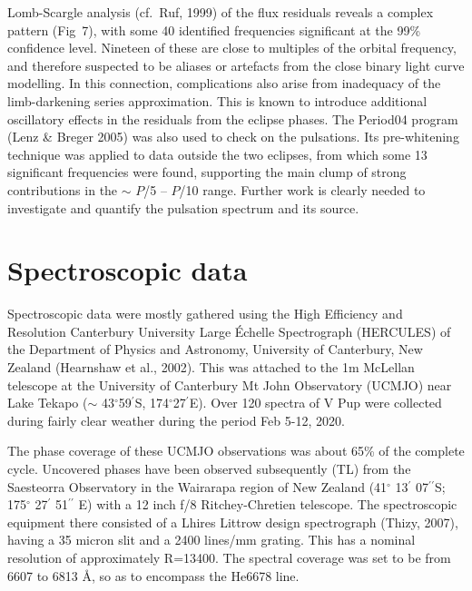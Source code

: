 \documentclass[useAMS,usenatbib]{mnras}                                                                           \usepackage[pdftex]{graphicx}
\def\degr{\hbox{$^\circ$}}
\def\arcmin{\hbox{$^\prime$}}
\begin{document}
  Lomb-Scargle analysis (cf.\ Ruf, 1999) 
of the flux residuals reveals a complex pattern
(Fig~7), with some 40 identified frequencies significant at the 99\% confidence level.
Nineteen of these are close to multiples of the orbital frequency, 
and therefore suspected to be aliases or artefacts from the close binary 
light curve modelling.  In this connection, complications also
arise from inadequacy of the limb-darkening series approximation.  This is known to
introduce additional oscillatory effects in the residuals from the
eclipse phases.  
The {\sc Period04} program (Lenz \& Breger 2005) was also used to check on 
the pulsations. Its pre-whitening technique was applied 
to data outside the two eclipses, from which some 13 significant
frequencies were found, supporting the main clump of strong
contributions in the $\sim$ $P$/5 -- $P$/10 range.
Further work is
clearly needed to investigate and quantify the pulsation spectrum and its source. 
 
\section{Spectroscopic data}
 
Spectroscopic data were mostly gathered using the
High Efficiency and Resolution Canterbury University Large
\'{E}chelle Spectrograph (HERCULES) of the Department of
Physics and Astronomy, University of Canterbury, New
Zealand (Hearnshaw et al., 2002).
 This was attached to the 1m McLellan telescope at
the University of Canterbury Mt John Observatory (UCMJO) near Lake
Tekapo ($\sim$ 43{\degr}59{\arcmin}S, 174{\degr}27{\arcmin}E).  Over 120 spectra 
of V Pup were collected during
fairly clear weather during the period Feb 5-12, 2020.

The phase coverage of these UCMJO observations was about 65\% of the complete cycle.
Uncovered phases have been observed subsequently (TL) from the Saesteorra Observatory in the Wairarapa region of New Zealand 
(41$^{\circ}$ 13$^{\prime}$ 07$^{{\prime}{\prime}}$S;  
175$^{\circ}$ 27$^{\prime}$ 51$^{{\prime}{\prime}}$
E) with a 12 inch f/8 Ritchey-Chretien telescope.  The spectroscopic equipment there
consisted of a Lhires Littrow design spectrograph (Thizy, 2007), 
having a 35 micron slit and a 2400 lines/mm grating.  This has a nominal resolution of 
approximately R=13400. 
 The spectral coverage was set to be from 6607 to 6813 {\AA}, 
so as to encompass the He6678 line. 
\end{document}
